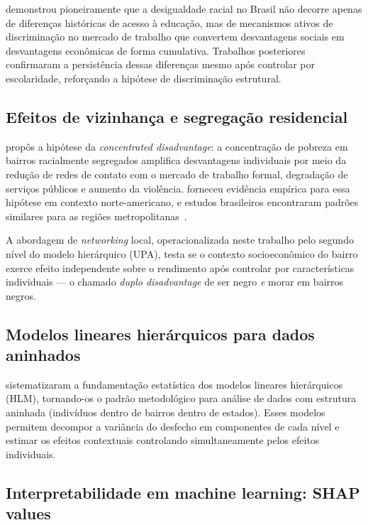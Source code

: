 \documentclass[12pt, a4paper, oneside]{article}
\begin{document}
 demonstrou pioneiramente que a desigualdade racial
no Brasil não decorre apenas de diferenças históricas de acesso à educação,
mas de mecanismos ativos de discriminação no mercado de trabalho que
convertem desvantagens sociais em desvantagens econômicas de forma cumulativa.
Trabalhos posteriores~\cite{henriques2001, soares2009} confirmaram a
persistência dessas diferenças mesmo após controlar por escolaridade,
reforçando a hipótese de discriminação estrutural.

\subsection{Efeitos de vizinhança e segregação residencial}

 propôs a hipótese da \textit{concentrated disadvantage}:
a concentração de pobreza em bairros racialmente segregados amplifica
desvantagens individuais por meio da redução de redes de contato com
o mercado de trabalho formal, degradação de serviços públicos e aumento
da violência.  forneceu evidência empírica para essa
hipótese em contexto norte-americano, e estudos brasileiros encontraram
padrões similares para as regiões metropolitanas~\cite{marques2010}.

A abordagem de \textit{networking} local, operacionalizada neste trabalho
pelo segundo nível do modelo hierárquico (UPA), testa se o contexto
socioeconômico do bairro exerce efeito independente sobre o rendimento
após controlar por características individuais --- o chamado
\textit{duplo disadvantage} de ser negro \textit{e} morar em bairros negros.

\subsection{Modelos lineares hierárquicos para dados aninhados}

 sistematizaram a fundamentação estatística dos
modelos lineares hierárquicos (HLM), tornando-os o padrão metodológico para
análise de dados com estrutura aninhada (indivíduos dentro de bairros dentro
de estados). Esses modelos permitem decompor a variância do desfecho em
componentes de cada nível e estimar os efeitos contextuais
controlando simultaneamente pelos efeitos individuais.

\subsection{Interpretabilidade em machine learning: SHAP values}
\end{document}
